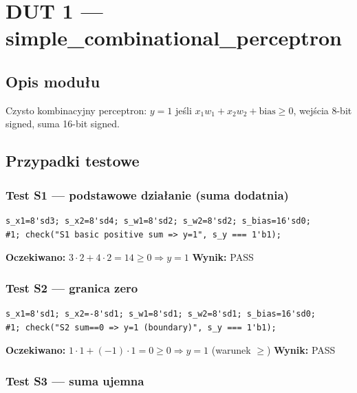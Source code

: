 \documentclass[12pt,a4paper]{article}
\begin{document}
\section{DUT 1 — simple\_combinational\_perceptron}

\subsection{Opis modułu}

Czysto kombinacyjny perceptron: $y = 1$ jeśli $x_1 w_1 + x_2 w_2 + \text{bias} \geq 0$, wejścia 8-bit signed, suma 16-bit signed.

\subsection{Przypadki testowe}

\subsubsection*{Test S1 — podstawowe działanie (suma dodatnia)}

\begin{lstlisting}
s_x1=8'sd3; s_x2=8'sd4; s_w1=8'sd2; s_w2=8'sd2; s_bias=16'sd0;
#1; check("S1 basic positive sum => y=1", s_y === 1'b1);
\end{lstlisting}

\textbf{Oczekiwano:} $3 \cdot 2 + 4 \cdot 2 = 14 \geq 0 \Rightarrow y = 1$ \quad \textbf{Wynik:} PASS

\subsubsection*{Test S2 — granica zero}

\begin{lstlisting}
s_x1=8'sd1; s_x2=-8'sd1; s_w1=8'sd1; s_w2=8'sd1; s_bias=16'sd0;
#1; check("S2 sum==0 => y=1 (boundary)", s_y === 1'b1);
\end{lstlisting}

\textbf{Oczekiwano:} $1 \cdot 1 + (-1) \cdot 1 = 0 \geq 0 \Rightarrow y = 1$ (warunek $\geq$) \quad \textbf{Wynik:} PASS

\subsubsection*{Test S3 — suma ujemna}
\end{document}
